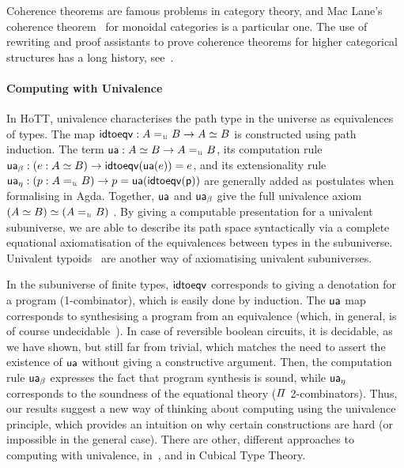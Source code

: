Coherence theorems are famous problems in category theory, and Mac Lane's coherence
theorem~\cite{maclaneNaturalAssociativityCommutativity1963,joyalBraidedTensorCategories1993,gurskiInfiniteLoopSpaces2013}
for monoidal categories is a particular one. The use of rewriting and proof assistants to prove coherence theorems for
higher categorical structures has a long history,
see~\cite{forestCoherenceGrayCategories2018,beylinExtractingProofCoherence1996}.

\paragraph{Computing with Univalence} In HoTT, univalence characterises the path type in the universe as equivalences of
types. The map $\term{idtoeqv} : A \id_{\UU} B \to A \eqv B$ is constructed using path induction. The term $\term{ua} :
{A \eqv B \to A \id_{\UU} B}$, its computation rule $\term{ua_\beta} : {(e : A \eqv B) \to \term{idtoeqv}(\term{ua}(e))
\id e}$, and its extensionality rule $\term{ua_\eta} : {(p : A \id_{\UU} B) \to p \id \term{ua}(\term{idtoeqv(p)})}$ are
generally added as postulates when formalising in Agda. Together, $\operatorname{\mathsf{ua}}$ and $\operatorname{\mathsf{ua}}_\beta$ give the full
univalence axiom ${(A \eqv B) \eqv (A \id_{\UU} B)}$ \cite[Theorem 3.5]{ortonDecomposingUnivalenceAxiom2018}.
By giving a computable presentation for a univalent subuniverse, we are able to describe its path space syntactically
via a complete equational axiomatisation of the equivalences between types in the subuniverse. Univalent
typoids~\cite{petrakisUnivalentTypoids2019} are another way of axiomatising univalent subuniverses.

In the subuniverse of finite types, $\operatorname{\mathsf{idtoeqv}}$ corresponds to giving a denotation for a program (1-combinator),
which is easily done by induction. The $\operatorname{\mathsf{ua}}$ map corresponds to synthesising a program from an equivalence (which,
in general, is of course undecidable~\cite{krogmeierDecidableSynthesisPrograms2020}). In case of reversible boolean
circuits, it is decidable, as we have shown, but still far from trivial, which matches the need to assert the existence
of $\operatorname{\mathsf{ua}}$ without giving a constructive argument. Then, the computation rule $\operatorname{\mathsf{ua_\beta}}$ expresses the fact
that program synthesis is sound, while $\operatorname{\mathsf{ua_\eta}}$ corresponds to the soundness of the equational theory ($\mathit{\Pi}$
2-combinators). Thus, our results suggest a new way of thinking about computing using the univalence principle, which
provides an intuition on why certain constructions are hard (or impossible in the general case). There are other,
different approaches to computing with univalence,
in~\cite{angiuliInternalizingRepresentationIndependence2021,tabareauMarriageUnivalenceParametricity2021}, and in Cubical
Type Theory\cite{angiuliComputationalSemanticsCartesianCubical2019,vezzosiCubicalAgdaDependently2019}.

